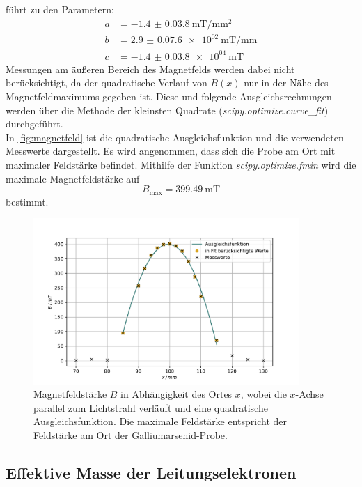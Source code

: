 führt zu den Parametern:
\begin{align*}
    a &= \qty{-1.4(0.038)}{\milli \tesla / \milli \metre^2} \\
    b &= \qty{2.9(0.076)e+02}{\milli \tesla / \milli \metre} \\
    c &= \qty{-1.4(0.038)e+04}{\milli \tesla}
\end{align*}
Messungen am äußeren Bereich des Magnetfelds werden dabei nicht berücksichtigt, da der quadratische Verlauf von $B(x)$ nur in der Nähe des Magnetfeldmaximums gegeben ist.
Diese und folgende Ausgleichsrechnungen werden über die Methode der kleinsten Quadrate (\textit{scipy.optimize.curve\_fit}\cite{scipy}) durchgeführt.
\\
In \autoref{fig:magnetfeld} ist die quadratische Ausgleichsfunktion und die verwendeten Messwerte dargestellt.
Es wird angenommen, dass sich die Probe am Ort mit maximaler Feldstärke befindet.
Mithilfe der Funktion \textit{scipy.optimize.fmin}\cite{scipy} wird die maximale Magnetfeldstärke auf
\begin{equation}
    B_\text{max} = \qty{399.49}{\milli\tesla}
\end{equation}
bestimmt.

\begin{figure}
    \centering
    \includegraphics[width=0.9\textwidth]{figure/magnetfeld.pdf}
    \caption{Magnetfeldstärke $B$ in Abhängigkeit des Ortes $x$, wobei die $x$-Achse parallel zum Lichtstrahl verläuft und eine quadratische Ausgleichsfunktion.
    Die maximale Feldstärke entspricht der Feldstärke am Ort der Galliumarsenid-Probe.}
    \label{fig:magnetfeld}
\end{figure}
\FloatBarrier

\subsection{Effektive Masse der Leitungselektronen}

